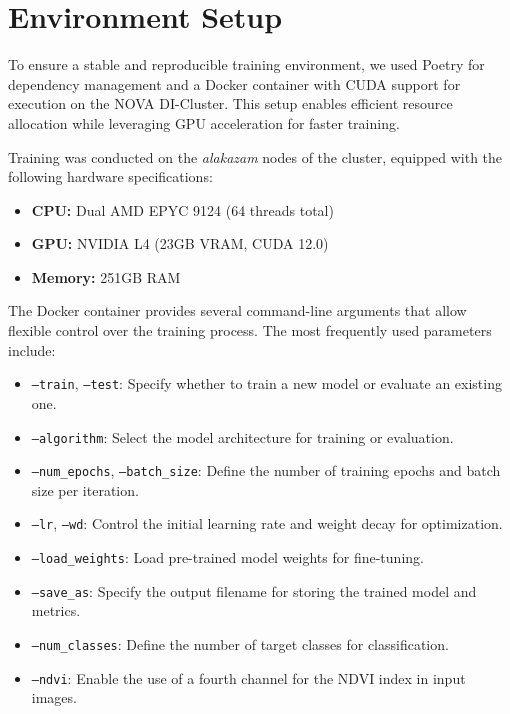 \section{Environment Setup}

To ensure a stable and reproducible training environment, we used Poetry \cite{poetry2023} for 
dependency management and a Docker \cite{docker2023} container with CUDA support for execution 
on the NOVA DI-Cluster. This setup enables efficient resource allocation while leveraging GPU 
acceleration for faster training.

Training was conducted on the \textit{alakazam} nodes of the cluster, equipped with the 
following hardware specifications:

\begin{itemize}
    \item \textbf{CPU:} Dual AMD EPYC 9124 (64 threads total)
    \item \textbf{GPU:} NVIDIA L4 (23GB VRAM, CUDA 12.0)
    \item \textbf{Memory:} 251GB RAM
\end{itemize}

The Docker container provides several command-line arguments that allow flexible control 
over the training process. The most frequently used parameters include:

\begin{itemize}
    \item \texttt{--train}, \texttt{--test}: Specify whether to train a new model or evaluate an existing one.
    \item \texttt{--algorithm}: Select the model architecture for training or evaluation.
    \item \texttt{--num\_epochs}, \texttt{--batch\_size}: Define the number of training epochs and batch size per iteration.
    \item \texttt{--lr}, \texttt{--wd}: Control the initial learning rate and weight decay for optimization.
    \item \texttt{--load\_weights}: Load pre-trained model weights for fine-tuning.
    \item \texttt{--save\_as}: Specify the output filename for storing the trained model and metrics.
    \item \texttt{--num\_classes}: Define the number of target classes for classification.
    \item \texttt{--ndvi}: Enable the use of a fourth channel for the NDVI index in input images.
\end{itemize}

